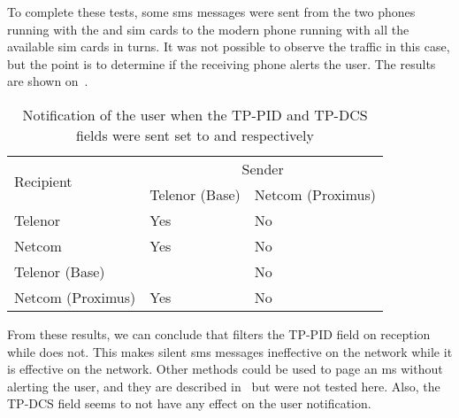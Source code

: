       \iffalse
      The TP-PID field is filtered either by \comp{Telenor} on
      reception, or by \comp{Netcom} on sending. Need to find a second
      \comp{Telenor} \gls{sim} to make sure of that. Also need to try
      sending from on \comp{Netcom} \gls{sim} to the other. I need to
      test that a bit more and to check all the values again. I need to
      have two true Telenor sims and two true Netcom sims which work
      with OsmocomBB.\fxnote{fixme!}
      \fi

      To complete these tests, some \gls{sms} messages were sent from
      the two phones running  with the 
      and  \gls{sim} cards to the modern phone running
       with all the available \gls{sim} cards in turns. It
      was not possible to observe the traffic in this case, but the
      point is to determine if the receiving phone alerts the user. The
      results are shown on~.

      \begin{table}[h]
        \centering
        \begin{tabular}{@{}lll@{}}
          \toprule
          \multirow{2}{*}{Recipient} & \multicolumn{2}{c}{Sender}   \\
          \cmidrule(l){2-3}
                            & Telenor (Base)    & Netcom (Proximus) \\
          \midrule
          Telenor           & Yes               & No                \\
          Netcom            & Yes               & No                \\
          Telenor (Base)    &                   & No                \\
          Netcom (Proximus) & Yes               & No                \\
          \bottomrule
        \end{tabular}
        \caption{Notification of the user when the TP-PID and TP-DCS
        fields were sent set to  and 
      respectively}
        \label{tab:silent_sms_notification}
      \end{table}
      
      From these results, we can conclude that  filters
      the TP-PID field on reception while  does not. This
      makes silent \gls{sms} messages ineffective on the 
      network while it is effective on the  network. Other
      methods could be used to page an \gls{ms} without alerting the
      user, and they are described in~ but
      were not tested here. Also, the TP-DCS field seems to not have any
      effect on the user notification.

